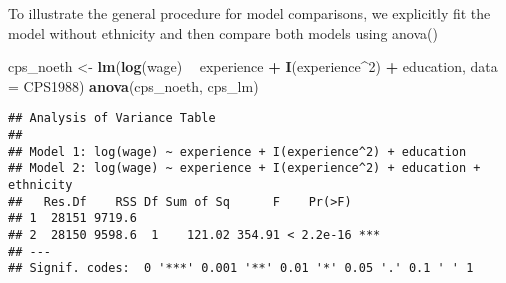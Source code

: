 \documentclass[]{article}
\newenvironment{Shaded}{\begin{snugshade}}{\end{snugshade}}
\newcommand{\KeywordTok}[1]{\textcolor[rgb]{0.13,0.29,0.53}{\textbf{#1}}}
\newcommand{\DataTypeTok}[1]{\textcolor[rgb]{0.13,0.29,0.53}{#1}}
\newcommand{\DecValTok}[1]{\textcolor[rgb]{0.00,0.00,0.81}{#1}}
\newcommand{\StringTok}[1]{\textcolor[rgb]{0.31,0.60,0.02}{#1}}
\newcommand{\OperatorTok}[1]{\textcolor[rgb]{0.81,0.36,0.00}{\textbf{#1}}}
\newcommand{\NormalTok}[1]{#1}
\begin{document}
To illustrate the general procedure for model comparisons, we explicitly
fit the model without ethnicity and then compare both models using
anova()

\begin{Shaded}
\begin{Highlighting}[]
\NormalTok{cps_noeth <-}\StringTok{ }\KeywordTok{lm}\NormalTok{(}\KeywordTok{log}\NormalTok{(wage) }\OperatorTok{~}\StringTok{ }\NormalTok{experience }\OperatorTok{+}\StringTok{ }\KeywordTok{I}\NormalTok{(experience}\OperatorTok{^}\DecValTok{2}\NormalTok{) }\OperatorTok{+}\StringTok{ }\NormalTok{education, }\DataTypeTok{data =}\NormalTok{ CPS1988)}
\KeywordTok{anova}\NormalTok{(cps_noeth, cps_lm)}
\end{Highlighting}
\end{Shaded}

\begin{verbatim}
## Analysis of Variance Table
## 
## Model 1: log(wage) ~ experience + I(experience^2) + education
## Model 2: log(wage) ~ experience + I(experience^2) + education + ethnicity
##   Res.Df    RSS Df Sum of Sq      F    Pr(>F)    
## 1  28151 9719.6                                  
## 2  28150 9598.6  1    121.02 354.91 < 2.2e-16 ***
## ---
## Signif. codes:  0 '***' 0.001 '**' 0.01 '*' 0.05 '.' 0.1 ' ' 1
\end{verbatim}
\end{document}
